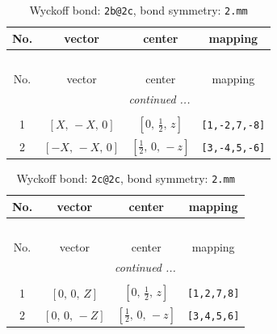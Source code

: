 \documentclass[fleqn,8pt]{jsarticle}
\begin{document}
\renewcommand{\arraystretch}{1.2}
\begin{longtable}{cccc}
\caption{Wyckoff bond: {\tt 2b@2c}, bond symmetry: {\tt 2.mm}}
 \\
 \hline \hline
No. & vector & center & mapping \\ \hline \endfirsthead

\multicolumn{3}{l}{\tablename\ \thetable{}} \\
 \hline \hline
No. & vector & center & mapping \\ \hline \endhead

 \hline \hline
\multicolumn{3}{r}{\footnotesize\it continued ...} \\ \endfoot

 \hline \hline
\multicolumn{3}{r}{} \\ \endlastfoot

1 & $\left[ X,\, - X,\, 0 \right]$ & $\left[ 0,\, \frac{1}{2},\, z \right]$ & {\tt [1,-2,7,-8]} \\ \hline
2 & $\left[ - X,\, - X,\, 0 \right]$ & $\left[ \frac{1}{2},\, 0,\, - z \right]$ & {\tt [3,-4,5,-6]} \\
\end{longtable}
\renewcommand{\arraystretch}{1.2}
\begin{longtable}{cccc}
\caption{Wyckoff bond: {\tt 2c@2c}, bond symmetry: {\tt 2.mm}}
 \\
 \hline \hline
No. & vector & center & mapping \\ \hline \endfirsthead

\multicolumn{3}{l}{\tablename\ \thetable{}} \\
 \hline \hline
No. & vector & center & mapping \\ \hline \endhead

 \hline \hline
\multicolumn{3}{r}{\footnotesize\it continued ...} \\ \endfoot

 \hline \hline
\multicolumn{3}{r}{} \\ \endlastfoot

1 & $\left[ 0,\, 0,\, Z \right]$ & $\left[ 0,\, \frac{1}{2},\, z \right]$ & {\tt [1,2,7,8]} \\ \hline
2 & $\left[ 0,\, 0,\, - Z \right]$ & $\left[ \frac{1}{2},\, 0,\, - z \right]$ & {\tt [3,4,5,6]} \\
\end{longtable}
\renewcommand{\arraystretch}{1.2}
\end{document}

